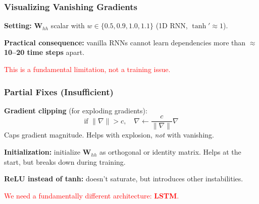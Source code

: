 \documentclass[notes,11pt, aspectratio=169]{beamer}
\newcommand{\vh}{\mathbf{h}}
\newcommand{\vW}{\mathbf{W}}
\begin{document}
\begin{frame}
\frametitle{Visualizing Vanishing Gradients}

\textbf{Setting:} $\vW_{hh}$ scalar with $w \in \{0.5, 0.9, 1.0, 1.1\}$ (1D RNN, $\tanh' \approx 1$).

\begin{center}
\end{center}

\vspace{6pt}
\textbf{Practical consequence:} vanilla RNNs cannot learn dependencies more than \textbf{$\approx$10--20 time steps} apart.

\textcolor{red}{This is a fundamental limitation, not a training issue.}
\end{frame}

\begin{frame}
\frametitle{Partial Fixes (Insufficient)}

\textbf{Gradient clipping} (for exploding gradients):
\[
    \text{if } \|\nabla\| > c, \quad \nabla \leftarrow \frac{c}{\|\nabla\|} \nabla
\]
Caps gradient magnitude. Helps with explosion, \emph{not} with vanishing.

\vspace{8pt}
\textbf{Initialization:} initialize $\vW_{hh}$ as orthogonal or identity matrix. Helps at the start, but breaks down during training.

\vspace{8pt}
\textbf{ReLU instead of tanh:} doesn't saturate, but introduces other instabilities.

\vspace{12pt}
\begin{center}
\end{center}

\vspace{4pt}
\begin{center}
\textcolor{red}{We need a fundamentally different architecture: \textbf{LSTM}.}
\end{center}
\end{frame}
\end{document}
